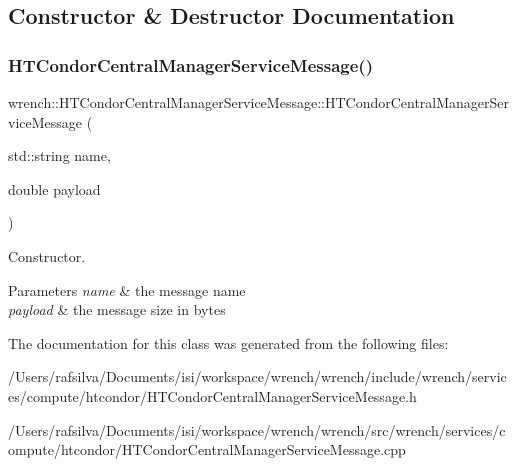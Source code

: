 \subsection{Constructor \& Destructor Documentation}
\mbox{\label{classwrench_1_1_h_t_condor_central_manager_service_message_a18405b39184680404710905465d3a573}} 
\subsubsection{\texorpdfstring{H\+T\+Condor\+Central\+Manager\+Service\+Message()}{HTCondorCentralManagerServiceMessage()}}
{\footnotesize\ttfamily wrench\+::\+H\+T\+Condor\+Central\+Manager\+Service\+Message\+::\+H\+T\+Condor\+Central\+Manager\+Service\+Message (\begin{DoxyParamCaption}\item[{std\+::string}]{name,  }\item[{double}]{payload }\end{DoxyParamCaption})\hspace{0.3cm}{\ttfamily [protected]}}



Constructor. 


\begin{DoxyParams}{Parameters}
{\em name} & the message name \\
\hline
{\em payload} & the message size in bytes \\
\hline
\end{DoxyParams}


The documentation for this class was generated from the following files\+:\begin{DoxyCompactItemize}
\item 
/\+Users/rafsilva/\+Documents/isi/workspace/wrench/wrench/include/wrench/services/compute/htcondor/H\+T\+Condor\+Central\+Manager\+Service\+Message.\+h\item 
/\+Users/rafsilva/\+Documents/isi/workspace/wrench/wrench/src/wrench/services/compute/htcondor/H\+T\+Condor\+Central\+Manager\+Service\+Message.\+cpp\end{DoxyCompactItemize}
